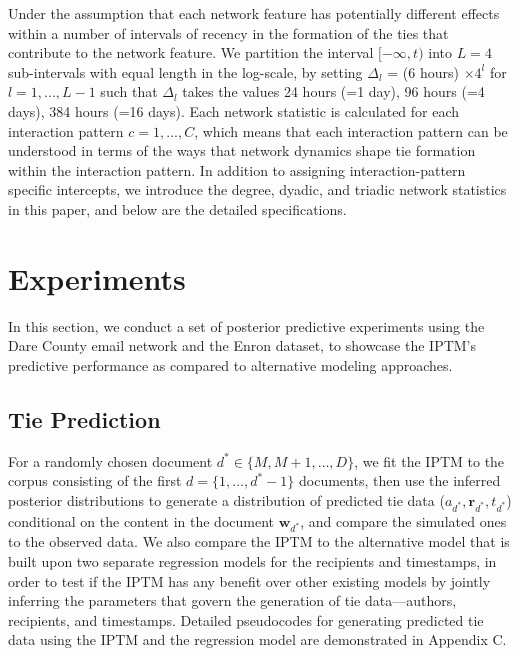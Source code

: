 \documentclass[twoside]{article}
\begin{document}
Under the assumption that each network feature has potentially different effects within a number of intervals of recency in the formation of the ties that contribute to the network feature. We partition the interval $[-\infty, t)$ into $L=4$ sub-intervals with equal length in the log-scale, by setting $\Delta_l$ = (6 hours) $\times  4^l$ for $l=1,...,L-1$ such that $\Delta_l$ takes the values 24 hours (=1 day), 96 hours (=4 days), 384 hours (=16 days).
Each network statistic is calculated for each interaction pattern $c=1,...,C$, which means that each interaction pattern can be understood in terms of the ways that network dynamics shape tie formation within the interaction pattern. In addition to assigning interaction-pattern specific intercepts, we introduce the degree, dyadic, and triadic network statistics in this paper, and below are the detailed specifications.


\section{Experiments}\label{sec:Experiments}
In this section, we conduct a set of posterior predictive experiments using the Dare County email network and the Enron dataset, to showcase the IPTM's predictive performance as compared to alternative modeling approaches.
\subsection{Tie Prediction}\label{subsec:Tie Prediction}
 For a randomly chosen document $d^* \in \{M, M+1,\ldots, D\}$, we fit the IPTM to the corpus consisting of the first $d = \{1,\hdots,d^*-1\}$ documents, then use the inferred posterior distributions to generate a distribution of predicted tie data ($a_{d^*}, \boldsymbol{r}_{d^*}, t_{d^*}$) conditional on the content in the document   $\boldsymbol{w}_{d^*}$, and compare the simulated ones to the observed data. We also compare the IPTM to the alternative model that is built upon two separate regression models for the recipients and timestamps, in order to test if the IPTM has any benefit over other existing models by jointly inferring the parameters that govern the generation of tie data---authors, recipients, and timestamps. Detailed pseudocodes for generating predicted tie data using the IPTM and the regression model are demonstrated in Appendix C.
 
\end{document}

